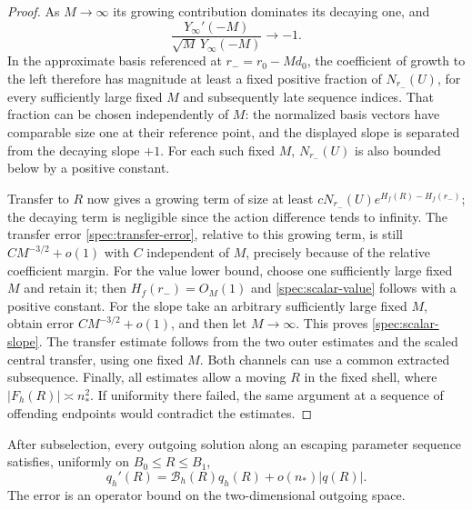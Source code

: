 \begin{proof}
As $M\to\infty$ its growing contribution dominates its decaying one,
and
\[
 \frac{Y_\infty'(-M)}{\sqrt M\,Y_\infty(-M)}\longrightarrow-1.
\]
In the approximate basis referenced at $r_-=r_0-Md_0$, the coefficient
of growth to the left therefore has magnitude at least a fixed
positive fraction of $N_{r_-}(U)$, for every sufficiently large fixed
$M$ and subsequently late sequence indices. That fraction can be
chosen independently of $M$: the normalized basis vectors have
comparable size one at their reference point, and the displayed
slope is separated from the decaying slope $+1$. For each such fixed
$M$, $N_{r_-}(U)$ is also bounded below by a positive constant.

Transfer to $R$ now gives a growing term of size at least
$cN_{r_-}(U)e^{H_f(R)-H_f(r_-)}$; the decaying term is negligible since
the action difference tends to infinity. The transfer error
\eqref{spec:transfer-error}, relative to this growing term, is still
$CM^{-3/2}+o(1)$ with $C$ independent of $M$, precisely because of the
relative coefficient margin. For the value lower bound, choose one
sufficiently large fixed $M$ and retain it; then $H_f(r_-)=O_M(1)$
and \eqref{spec:scalar-value} follows with a positive constant.
For the slope take an arbitrary sufficiently large fixed $M$, obtain
error $CM^{-3/2}+o(1)$, and then let $M\to\infty$. This proves
\eqref{spec:scalar-slope}. The transfer estimate follows from the two
outer estimates and the scaled central transfer, using one fixed
$M$. Both channels can use a common extracted subsequence. Finally,
all estimates allow a moving $R$ in the fixed shell, where
$|F_h(R)|\asymp n_*^2$. If uniformity there failed, the same argument
at a sequence of offending endpoints would contradict the estimates.
\end{proof}

\begin{lemma}\label{spec:boundary-estimate}
After subselection, every outgoing solution along an escaping
parameter sequence satisfies, uniformly on $B_0\le R\le B_1$,
\begin{equation}\label{spec:shell-robin}
 q_h'(R)=\mathcal B_h(R)q_h(R)+o(n_*)|q(R)|.
\end{equation}
The error is an operator bound on the two-dimensional outgoing space.
\end{lemma}

